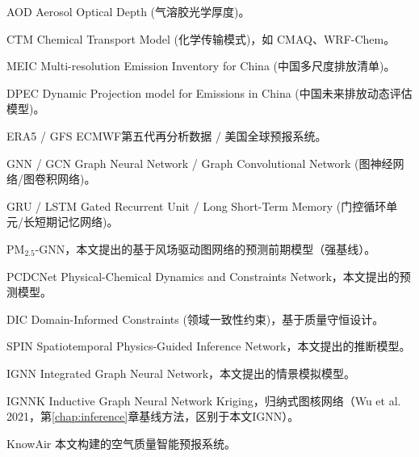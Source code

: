 \begin{denotation}[3cm]
\item[AOD] Aerosol Optical Depth (气溶胶光学厚度)。
\item[CTM] Chemical Transport Model (化学传输模式)，如 CMAQ、WRF-Chem。
\item[MEIC] Multi-resolution Emission Inventory for China (中国多尺度排放清单)。
\item[DPEC] Dynamic Projection model for Emissions in China (中国未来排放动态评估模型)。
\item[ERA5 / GFS] ECMWF第五代再分析数据 / 美国全球预报系统。
\item[GNN / GCN] Graph Neural Network / Graph Convolutional Network (图神经网络/图卷积网络)。
\item[GRU / LSTM] Gated Recurrent Unit / Long Short-Term Memory (门控循环单元/长短期记忆网络)。
\item[\ModelPred] \ensuremath{\mathrm{PM}_{2.5}}-GNN，本文提出的基于风场驱动图网络的预测前期模型（强基线）。
\item[PCDCNet] Physical-Chemical Dynamics and Constraints Network，本文提出的预测模型。
\item[DIC] Domain-Informed Constraints (领域一致性约束)，基于质量守恒设计。
\item[SPIN] Spatiotemporal Physics-Guided Inference Network，本文提出的推断模型。
\item[IGNN] Integrated Graph Neural Network，本文提出的情景模拟模型。
\item[IGNNK] Inductive Graph Neural Network Kriging，归纳式图核网络（Wu et al. 2021，第\ref{chap:inference}章基线方法，区别于本文IGNN）。
\item[KnowAir] 本文构建的空气质量智能预报系统。

\end{denotation}
